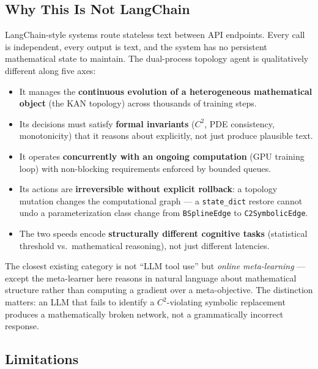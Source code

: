 \documentclass[11pt,a4paper]{article}
\begin{document}
\subsection{Why This Is Not LangChain}
\label{sec:discussion:notlangchain}

LangChain-style systems route stateless text between API endpoints. Every call is
independent, every output is text, and the system has no persistent mathematical state
to maintain. The dual-process topology agent is qualitatively different along five axes:

\begin{itemize}[nosep]
  \item It manages the \textbf{continuous evolution of a heterogeneous mathematical
  object} (the KAN topology) across thousands of training steps.

  \item Its decisions must satisfy \textbf{formal invariants} ($C^2$, PDE consistency,
  monotonicity) that it reasons about explicitly, not just produce plausible text.

  \item It operates \textbf{concurrently with an ongoing computation} (GPU training
  loop) with non-blocking requirements enforced by bounded queues.

  \item Its actions are \textbf{irreversible without explicit rollback}: a topology
  mutation changes the computational graph --- a \texttt{state\_dict} restore cannot
  undo a parameterization class change from \texttt{BSplineEdge} to
  \texttt{C2SymbolicEdge}.

  \item The two speeds encode \textbf{structurally different cognitive tasks}
  (statistical threshold vs.\ mathematical reasoning), not just different latencies.
\end{itemize}

The closest existing category is not ``LLM tool use'' but \emph{online meta-learning}
--- except the meta-learner here reasons in natural language about mathematical
structure rather than computing a gradient over a meta-objective. The distinction
matters: an LLM that fails to identify a $C^2$-violating symbolic replacement produces
a mathematically broken network, not a grammatically incorrect response.

\subsection{Limitations}
\label{sec:discussion:limitations}
\end{document}
